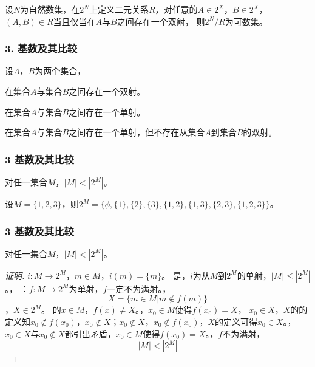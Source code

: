\documentclass{beamer}
\begin{document}
\begin{CJK*}{UTF8}{gbsn}
\begin{frame}[t]
 设$N$为自然数集，在$2^N$上定义二元关系$R$，对任意的$A\in 2^X$，$B\in 2^X$，$(A,B)\in R$当且仅当在$A$与$B$之间存在一个双射，
 则$2^N/R$为可数集。
\end{frame}

\begin{frame}
  \frametitle{3. 基数及其比较}
  设$A$，$B$为两个集合，
  \begin{description}
  \pause\item[$|A|=|B|:$]在集合$A$与集合$B$之间存在一个双射。
  \pause\item[$|A|\leq |B|:$]在集合$A$与集合$B$之间存在一个单射。
  \pause\item[$|A|< |B|:$]在集合$A$与集合$B$之间存在一个单射，但不存在从集合$A$到集合$B$的双射。
  \end{description}
\end{frame}







\begin{frame}[t]
  \frametitle{3 基数及其比较}
  \begin{Thm}[康托]
    对任一集合$M$，$|M| < |2^{M}|$。
  \end{Thm}
\pause
  设$M=\{1,2,3\}$，则$2^{M}=\{\phi,\{1\},\{2\},\{3\},\{1,2\},\{1,3\},\{2,3\},\{1,2,3\}\}$。
\end{frame}
\begin{frame}[t]
  \frametitle{3 基数及其比较}
  \begin{Thm}[康托]
    对任一集合$M$，$|M| < |2^{M}|$。
  \end{Thm}
  \begin{proof}[证明]\justifying\let\raggedright\justifying
    $i:M\to 2^M$，$m\in M$，\pause$i(m)=\{m\}$。
    是，\pause$i$为从$M$到$2^M$的单射，$|M|\leq |2^M|$。，
    ：$f:M\to 2^M$为单射，$f$一定不为满射。，
    \[X=\{m\in M|m \notin f(m)\}\]，\pause$X\in 2^M$。
    的$x\in M$，\pause$f(x)\neq X$。，$x_0\in M$使得$f(x_0)=X$，
    $x_0\in X$，$X$的的定义知$x_0\notin
    f(x_0)$，$x_0\notin X$；$x_0\notin X$，$x_0\notin f(x_0)$，$X$的定义可得$x_0\in X$。，\pause$x_0\in X$与$x_0\notin X$都引出矛盾，$x_0\in M$使得$f(x_0)=X$。，\pause$f$不为满射，
    \[|M|<|2^M|\]
  \end{proof}
\end{frame}


\end{CJK*}
\end{document}
